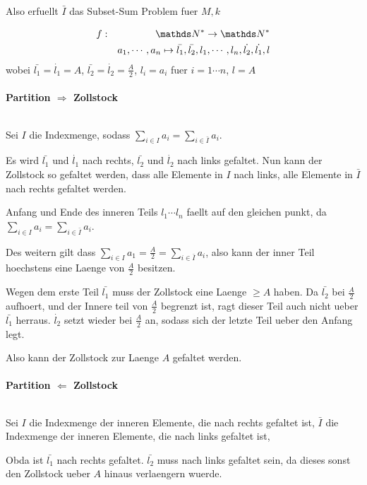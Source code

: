 Also erfuellt $\bar{I}$ das Subset-Sum Problem fuer $M,k$




\begin{eqnarray}
f &:& \N^* \to \N^* \\
  & & a_1,\cdots,a_n \mapsto \bar{l_1}, \bar{l_2}, l_1, \cdots,l_n, \dot{l_2}, \dot{l_1}, l
\end{eqnarray}
wobei $\bar{l_1} = \dot{l_1} = A$, $\bar{l_2} = \dot{l_2} = \frac{A}{2}$, $l_i = a_i$ fuer $i=1 \cdots n$,
      $l=A$

\paragraph{Partition $\Rightarrow$ Zollstock} $ $

Sei $I$ die Indexmenge, sodass $\sum_{i\in I} a_i = \sum_{i\in\bar{I}} a_i$.

Es wird $\bar{l_1}$ und $\dot{l_1}$ nach rechts, $\bar{l_2}$ und $\dot{l_2}$ nach links gefaltet.
Nun kann der Zollstock so gefaltet werden,
dass alle Elemente in $I$ nach links, alle Elemente in $\bar{I}$ nach rechts gefaltet werden.

Anfang und Ende des inneren Teils $l_1 \cdots l_n$ faellt auf den gleichen punkt, 
da $\sum_{i\in I} a_i = \sum_{i\in\bar{I}} a_i$.

Des weitern gilt dass $\sum_{i\in I} a_1 = \frac{A}{2} = \sum_{i\in \bar{I}} a_i$, 
also kann der inner Teil hoechstens eine Laenge von $\frac{A}{2}$ besitzen.

Wegen dem erste Teil $\bar{l_1}$ muss der Zollstock eine Laenge $\geq A$ haben.
Da $\bar{l_2}$ bei $\frac{A}{2}$ aufhoert, und der Innere teil von $\frac{A}{2}$ begrenzt ist,
ragt dieser Teil auch nicht ueber $\bar{l_1}$ herraus. 
$\dot{l_2}$ setzt wieder bei $\frac{A}{2}$ an, sodass sich der letzte Teil ueber den Anfang legt.

Also kann der Zollstock zur Laenge $A$ gefaltet werden.

\paragraph{Partition $\Leftarrow$ Zollstock} $ $

Sei $I$ die Indexmenge der inneren Elemente, die nach rechts gefaltet ist,
    $\bar{I}$ die Indexmenge der inneren Elemente, die nach links gefaltet ist,

Obda ist $\bar{l_1}$ nach rechts gefaltet. $\bar{l_2}$ muss nach links gefaltet sein,
da dieses sonst den Zollstock ueber $A$ hinaus verlaengern wuerde.


